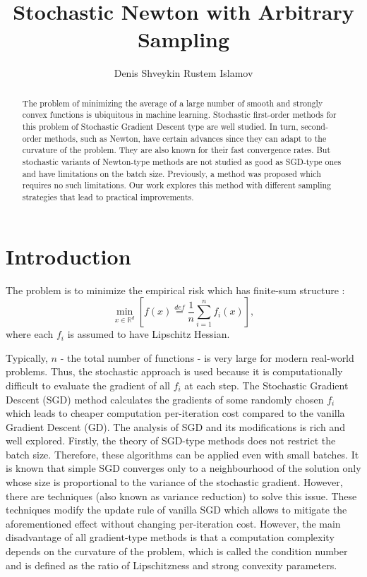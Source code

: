 \documentclass{article}
\title{Stochastic Newton with Arbitrary Sampling}
\author{Denis Shveykin
	\And
	Rustem Islamov
}
\date{}
\theoremstyle{definition}
\theoremstyle{assumption}
\theoremstyle{lemma}
\theoremstyle{theorem}
\theoremstyle{proposition}
\begin{document}
	
\maketitle

\begin{abstract}
	
	The problem of minimizing the average of a large number of smooth and strongly convex functions is ubiquitous in machine learning. Stochastic first-order methods for this problem of Stochastic Gradient Descent type are well studied. In turn, second-order methods, such as Newton, have certain advances since they can adapt to the curvature of the problem. They are also known for their fast convergence rates. But stochastic variants of Newton-type methods are not studied as good as SGD-type ones and have limitations on the batch size. Previously, a method was proposed which requires no such limitations. Our work explores this method with different sampling strategies that lead to practical improvements.
	
\end{abstract}



\section{Introduction}

	The problem is to minimize the empirical risk which has finite-sum structure \cite{kovalev2019stochastic}:
	\begin{equation}\label{ERM}
		\underset{x \in \mathbb R^d}{\min} \left[ f(x) \overset{def}{=} \frac{1}{n} \sum \limits_{i=1}^n f_i(x) \right],
	\end{equation}
	where each $f_i$ is assumed to have Lipschitz Hessian. 
	
	Typically, $n$ - the total number of functions - is very large for modern real-world problems. Thus, the stochastic approach is used because it is computationally difficult to evaluate the gradient of all $f_i$ at each step. The Stochastic Gradient Descent (SGD) method \cite{SGD-1} calculates the gradients of some randomly chosen $f_i$ which leads to cheaper computation per-iteration cost compared to the vanilla Gradient Descent (GD). The analysis of SGD and its modifications is rich and well explored. Firstly, the theory of SGD-type methods does not restrict the batch size. Therefore, these algorithms can be applied even with small batches. It is known that simple SGD converges only to a neighbourhood of the solution only \cite{sgd-hogwild, sgd-general-analysis} whose size is proportional to the variance of the stochastic gradient. However, there are techniques (also known as variance reduction) to solve this issue. These techniques \cite{exp-convergence, advances-NIPS, unified-sgd, one-method} modify the update rule of vanilla SGD which allows to mitigate the aforementioned effect without changing per-iteration cost. However, the main disadvantage of all gradient-type methods is that a computation complexity depends on the curvature of the problem, which is called the condition number and is defined as the ratio of Lipschitzness and strong convexity parameters. 
	
\end{document}
